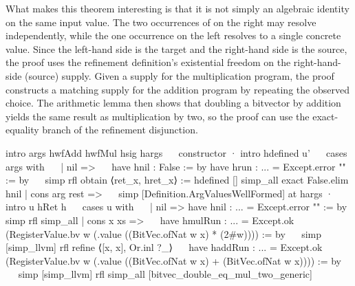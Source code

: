 What makes this theorem interesting is that it is not simply an algebraic
identity on the same input value. The two occurrences of \vundef on the right
may resolve independently, while the one occurrence on the left resolves to a
single concrete value. Since the left-hand side is the target and the
right-hand side is the source, the proof uses the refinement definition's
existential freedom on the right-hand-side (source) supply. Given a supply for the
multiplication program, the proof constructs a matching supply for the
addition program by repeating the observed choice. The arithmetic lemma then
shows that doubling a bitvector by addition yields the same result as
multiplication by two, so the proof can use the exact-equality branch of the
refinement disjunction.
\small
\begin{leanlisting}[numbers=left,xleftmargin=0.75em]
  intro args hwfAdd hwfMul hsig hargs ~\label{line:undef-proof-intro}~
  constructor
  · intro hdefined u' ~\label{line:undef-proof-definedness}~
    cases args with ~\label{line:undef-proof-args}~
    | nil => ~\label{line:undef-proof-nil-args}~
      have hnil : False := by
        have hrun : ... = Except.error "" := by ~\label{line:undef-proof-empty-supply}~
          simp
          rfl
        obtain ⟨ret_x, hret_x⟩ := hdefined []
        simp_all
      exact False.elim hnil
    | cons arg rest => ~\label{line:undef-proof-impossible-args}~
      simp [Definition.ArgValuesWellFormed] at hargs
  · intro u hRet h ~\label{line:undef-proof-value}~
    cases u with ~\label{line:undef-proof-supply-split}~
    | nil =>
        have hnil : ... = Except.error "" := by
          simp
          rfl
        simp_all
    | cons x xs => ~\label{line:undef-proof-cons-supply}~
      have hmulRun : ... =
          Except.ok (RegisterValue.bv w
            (.value ((BitVec.ofNat w x) * (2#w)))) := by ~\label{line:undef-proof-hmul}~
        simp [simp_llvm]
        rfl
      refine ⟨[x, x], Or.inl ?_⟩ ~\label{line:undef-proof-witness}~
      have haddRun : ... =
          Except.ok (RegisterValue.bv w
            (.value ((BitVec.ofNat w x) + (BitVec.ofNat w x)))) := by ~\label{line:undef-proof-hadd}~
        simp [simp_llvm]
        rfl
      simp_all [bitvec_double_eq_mul_two_generic] ~\label{line:undef-proof-simpall}~
\end{leanlisting}
\normalsize

